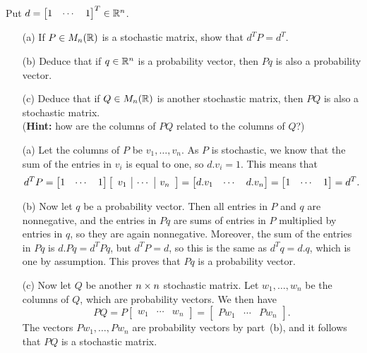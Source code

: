\documentclass[a4paper]{amsart}
\renewenvironment{solution}{\SolutionInline}{\endSolutionInline}
\begin{document}
\begin{exercise}\label{ex-stochastic-i}
 Put $d=\left[\begin{matrix} 1 &\cdots&1\end{matrix}\right]^T\in{\mathbb{R}}^n$.
 \begin{itemize}
  \item[(a)] If $P\in M_n({\mathbb{R}})$ is a stochastic matrix, show that $d^TP=d^T$.
  \item[(b)] Deduce that if $q\in{\mathbb{R}}^n$ is a probability vector, then
   $Pq$ is also a probability vector.
  \item[(c)] Deduce that if $Q\in M_n({\mathbb{R}})$ is another stochastic
   matrix, then $PQ$ is also a stochastic matrix.\\
   (\textbf{Hint:} how are the columns of $PQ$ related to the columns
   of $Q$?)
 \end{itemize}
\end{exercise}
\begin{solution}
 \begin{itemize}
  \item[(a)] Let the columns of $P$ be $v_1,\dotsc,v_n$.  As $P$ is
   stochastic, we know that the sum of the entries in $v_i$  is equal
   to one, so $d.v_i=1$.  This means that
   \[ d^TP =
      \left[\begin{matrix} 1 &\cdots& 1\end{matrix}\right] 
       \left[\begin{array}{c|c|c} 
       v_1 & \cdots & v_n 
      \end{array}\right] = 
      \left[\begin{matrix} d.v_1 & \cdots & d.v_n \end{matrix}\right] = 
      \left[\begin{matrix} 1 & \cdots & 1 \end{matrix}\right] = d^T.
   \]
  \item[(b)] Now let $q$ be a probability vector.  Then all entries in
   $P$ and $q$ are nonnegative, and the entries in $Pq$ are sums of
   entries in $P$ multiplied by entries in $q$, so they are again
   nonnegative.  Moreover, the sum of the entries in $Pq$ is
   $d.Pq=d^TPq$, but $d^TP=d$, so this is the same as $d^Tq=d.q$,
   which is one by assumption.  This proves that $Pq$ is a probability
   vector.
  \item[(c)] Now let $Q$ be another $n\times n$ stochastic matrix.  Let
   $w_1,\dotsc,w_n$ be the columns of $Q$, which are probability
   vectors.  We then have
   \[ PQ 
       = P \left[\begin{array}{c|c|c} 
            w_1 & \cdots & w_n 
           \end{array}\right] 
       =  \left[\begin{array}{c|c|c} 
            Pw_1 & \cdots & Pw_n 
           \end{array}\right].
   \]
   The vectors $Pw_1,\dotsc,Pw_n$ are probability vectors by part~(b),
   and it follows that $PQ$ is a stochastic matrix.
 \end{itemize}
\end{solution}
\end{document}
